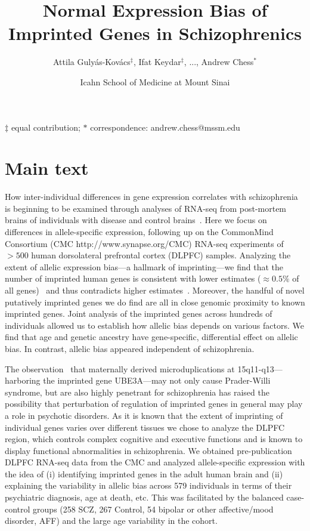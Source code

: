\documentclass[letterpaper]{article}
\title{Normal Expression Bias of Imprinted Genes in Schizophrenics}
\author{Attila Guly\'{a}s-Kov\'{a}cs\(^\ddagger\), Ifat Keydar\(^\ddagger\),
...,
Andrew Chess\(^\ast\)}
\date{Icahn School of Medicine at Mount Sinai}
\begin{document}
\maketitle
\begin{center}
\(\ddagger\) equal contribution;
\(\ast\) correspondence: andrew.chess@mssm.edu
\end{center}

\tableofcontents

\clearpage

\section{Main text}

How inter-individual differences in gene expression correlates with
schizophrenia is beginning to be examined through analyses of RNA-seq from
post-mortem brains of individuals with disease and control
brains~\cite{Fromer2016a}.  Here we focus on differences in allele-specific
expression, following up on the CommonMind Consortium (CMC
http://www.synapse.org/CMC) RNA-seq experiments of \(>500\) human dorsolateral
prefrontal cortex (DLPFC) samples.  Analyzing the extent of allelic expression
bias---a hallmark of imprinting---we find that the number of imprinted human
genes is consistent with lower estimates (\(\approx 0.5 \%\) of all
genes)~\cite{Andergassen2017,Babak2015,Baran2015,DeVeale2012,Perez2015} and
thus contradicts higher estimates~\cite{Gregg2010a}. Moreover, the handful of
novel putatively imprinted genes we do find are all in close genomic proximity
to known imprinted genes.  Joint analysis of the imprinted genes across hundreds
of individuals allowed us to establish how allelic bias depends on various
factors.  We find that age and genetic ancestry have gene-specific,
differential effect on allelic bias.  In contrast, allelic bias appeared
independent of schizophrenia.  

The observation~\cite{Noor2015,Rees2014} that maternally derived
microduplications at 15q11-q13---harboring the imprinted gene UBE3A---may not
only cause Prader-Willi syndrome, but are also highly penetrant for
schizophrenia has raised the possibility that perturbation of regulation of
imprinted genes in general may play a role in psychotic disorders.  As it is
known that the extent of imprinting of individual genes varies over different
tissues we chose to analyze the DLPFC region, which controls complex cognitive and
executive functions and is known to display functional abnormalities in
schizophrenia.  We obtained pre-publication DLPFC RNA-seq data from the CMC
and analyzed allele-specific expression with the idea of (i) identifying
imprinted genes in the adult human brain and (ii) explaining the
variability in allelic bias across 579 individuals in terms of their
psychiatric diagnosis, age at death, etc.  This was facilitated by the
balanced case-control groups (258 SCZ, 267 Control, 54 bipolar or other
affective/mood disorder, AFF) and the large age variability in the cohort.
\end{document}
